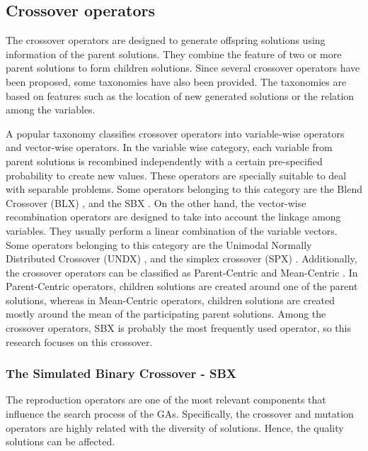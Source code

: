 \subsection{Crossover operators}
The crossover operators are designed to generate offspring solutions using information of the parent solutions.
%
They combine the feature of two or more parent solutions to form children solutions.
%
Since several crossover operators have been proposed, some taxonomies have also been provided.
%
The taxonomies are based on features such as the location of new generated solutions or the relation among the variables.
%

A popular taxonomy classifies crossover operators into variable-wise operators and vector-wise operators.
%
In the variable wise category, each variable from parent solutions is recombined independently with a certain pre-specified probability to create new values.
%
These operators are specially suitable to deal with separable problems.
%
Some operators belonging to this category are the Blend Crossover (BLX) \cite{eshelman1993real}, and the SBX \cite{Joel:SBX1994}.
%
On the other hand, the vector-wise recombination operators are designed to take into account the linkage among variables.
%
They usually perform a linear combination of the variable vectors.
%
Some operators belonging to this category are the Unimodal Normally Distributed Crossover (UNDX) \cite{Joel:UNDX}, and the simplex crossover (SPX) \cite{Joel:DE_Storn_SPX}.
%
Additionally, the crossover operators can be classified as Parent-Centric and Mean-Centric \cite{jain2011parent}.
%
In Parent-Centric operators, children solutions are created around one of the parent solutions, whereas in Mean-Centric operators, children solutions are created mostly around the mean of the participating parent solutions.
%
Among the crossover operators, SBX is probably the most frequently used operator, so this research focuses on this crossover.

\subsubsection{The Simulated Binary Crossover - SBX}

The reproduction operators are one of the most relevant components that influence the search process of the GAs.
%
Specifically, the crossover and mutation operators are highly related with the diversity of solutions.
%
Hence, the quality solutions can be affected.
%

